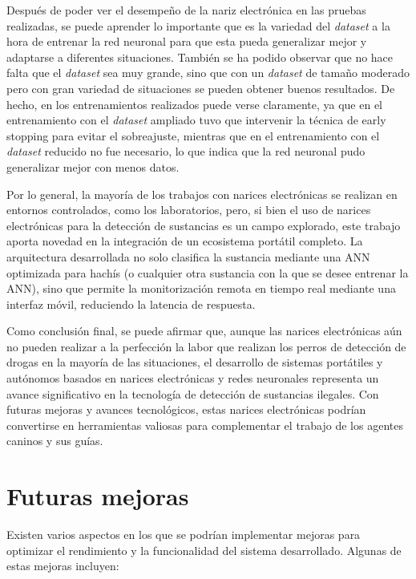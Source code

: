 Después de poder ver el desempeño de la nariz electrónica en las pruebas realizadas, se puede aprender lo importante que es la variedad del \textit{dataset} a la hora de entrenar la red neuronal para que esta pueda generalizar mejor y adaptarse a diferentes situaciones. También se ha podido observar que no hace falta que el \textit{dataset} sea muy grande, sino que con un \textit{dataset} de tamaño moderado pero con gran variedad de situaciones se pueden obtener buenos resultados. De hecho, en los entrenamientos realizados puede verse claramente, ya que en el entrenamiento con el \textit{dataset} ampliado tuvo que intervenir la técnica de early stopping para evitar el sobreajuste, mientras que en el entrenamiento con el \textit{dataset} reducido no fue necesario, lo que indica que la red neuronal pudo generalizar mejor con menos datos.
\par

Por lo general, la mayoría de los trabajos con narices electrónicas se realizan en entornos controlados, como los laboratorios, pero, si bien el uso de narices electrónicas para la detección de sustancias es un campo explorado, este trabajo aporta novedad en la integración de un ecosistema portátil completo. La arquitectura desarrollada no solo clasifica la sustancia mediante una ANN optimizada para hachís (o cualquier otra sustancia con la que se desee entrenar la ANN), sino que permite la monitorización remota en tiempo real mediante una interfaz móvil, reduciendo la latencia de respuesta.
\par

Como conclusión final, se puede afirmar que, aunque las narices electrónicas aún no pueden realizar a la perfección la labor que realizan los perros de detección de drogas en la mayoría de las situaciones, el desarrollo de sistemas portátiles y autónomos basados en narices electrónicas y redes neuronales representa un avance significativo en la tecnología de detección de sustancias ilegales. Con futuras mejoras y avances tecnológicos, estas narices electrónicas podrían convertirse en herramientas valiosas para complementar el trabajo de los agentes caninos y sus guías.

\section{Futuras mejoras}
Existen varios aspectos en los que se podrían implementar mejoras para optimizar el rendimiento y la funcionalidad del sistema desarrollado. Algunas de estas mejoras incluyen:

